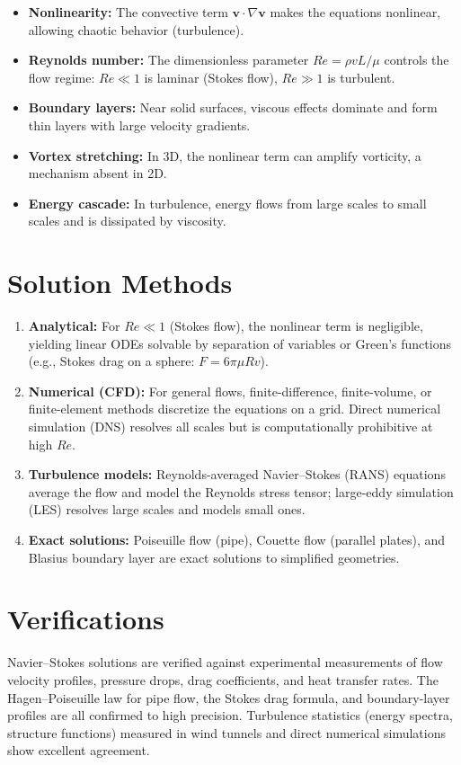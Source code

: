 \documentclass[11pt,openright]{book}
\begin{document}
\begin{itemize}
  \item \textbf{Nonlinearity:} The convective term $\mathbf{v}\cdot\nabla\mathbf{v}$ makes the equations nonlinear, allowing chaotic behavior (turbulence).
  \item \textbf{Reynolds number:} The dimensionless parameter $Re = \rho v L/\mu$ controls the flow regime: $Re \ll 1$ is laminar (Stokes flow), $Re \gg 1$ is turbulent.
  \item \textbf{Boundary layers:} Near solid surfaces, viscous effects dominate and form thin layers with large velocity gradients.
  \item \textbf{Vortex stretching:} In 3D, the nonlinear term can amplify vorticity, a mechanism absent in 2D.
  \item \textbf{Energy cascade:} In turbulence, energy flows from large scales to small scales and is dissipated by viscosity.
\end{itemize}
\section*{Solution Methods}

\begin{enumerate}
  \item \textbf{Analytical:} For $Re \ll 1$ (Stokes flow), the nonlinear term is negligible, yielding linear ODEs solvable by separation of variables or Green's functions (e.g., Stokes drag on a sphere: $F = 6\pi\mu R v$).
  \item \textbf{Numerical (CFD):} For general flows, finite-difference, finite-volume, or finite-element methods discretize the equations on a grid. Direct numerical simulation (DNS) resolves all scales but is computationally prohibitive at high $Re$.
  \item \textbf{Turbulence models:} Reynolds-averaged Navier--Stokes (RANS) equations average the flow and model the Reynolds stress tensor; large-eddy simulation (LES) resolves large scales and models small ones.
  \item \textbf{Exact solutions:} Poiseuille flow (pipe), Couette flow (parallel plates), and Blasius boundary layer are exact solutions to simplified geometries.
\end{enumerate}
\section*{Verifications}

Navier--Stokes solutions are verified against experimental measurements of flow velocity profiles, pressure drops, drag coefficients, and heat transfer rates. The Hagen--Poiseuille law for pipe flow, the Stokes drag formula, and boundary-layer profiles are all confirmed to high precision. Turbulence statistics (energy spectra, structure functions) measured in wind tunnels and direct numerical simulations show excellent agreement.
\end{document}
